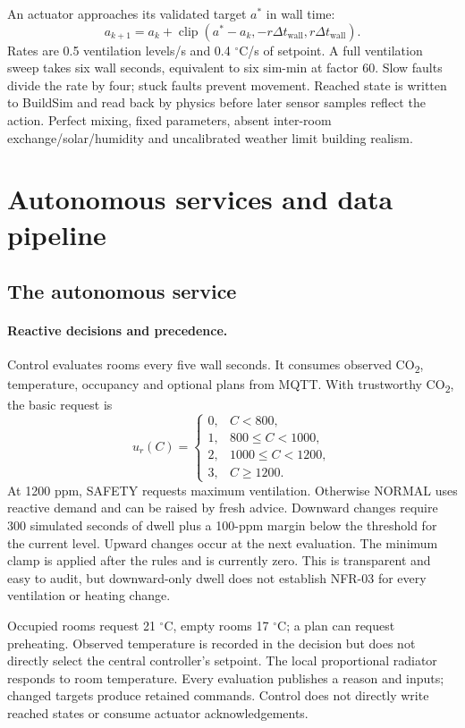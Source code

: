 \documentclass[11pt,a4paper]{article}
\begin{document}
An actuator approaches its validated target $a^*$ in wall time:
\begin{equation}
a_{k+1}=a_k+\operatorname{clip}(a^*-a_k,-r\Delta t_{\mathrm{wall}},r\Delta t_{\mathrm{wall}}).
\end{equation}
Rates are 0.5 ventilation levels/s and 0.4 $^\circ$C/s of setpoint. A full ventilation sweep takes six wall seconds, equivalent to six sim-min at factor 60. Slow faults divide the rate by four; stuck faults prevent movement. Reached state is written to BuildSim and read back by physics before later sensor samples reflect the action. Perfect mixing, fixed parameters, absent inter-room exchange/solar/humidity and uncalibrated weather limit building realism.

\section{Autonomous services and data pipeline}
\subsection{The autonomous service}
\paragraph{Reactive decisions and precedence.}
Control evaluates rooms every five wall seconds. It consumes observed CO\textsubscript{2}, temperature, occupancy and optional plans from MQTT. With trustworthy CO\textsubscript{2}, the basic request is
\begin{equation}
u_r(C)=\begin{cases}0,&C<800,\\1,&800\leq C<1000,\\
2,&1000\leq C<1200,\\3,&C\geq1200.\end{cases}
\end{equation}
At 1200 ppm, SAFETY requests maximum ventilation. Otherwise NORMAL uses reactive demand and can be raised by fresh advice. Downward changes require 300 simulated seconds of dwell plus a 100-ppm margin below the threshold for the current level. Upward changes occur at the next evaluation. The minimum clamp is applied after the rules and is currently zero. This is transparent and easy to audit, but downward-only dwell does not establish NFR-03 for every ventilation or heating change.

Occupied rooms request 21 $^\circ$C, empty rooms 17 $^\circ$C; a plan can request preheating. Observed temperature is recorded in the decision but does not directly select the central controller's setpoint. The local proportional radiator responds to room temperature. Every evaluation publishes a reason and inputs; changed targets produce retained commands. Control does not directly write reached states or consume actuator acknowledgements.
\end{document}
